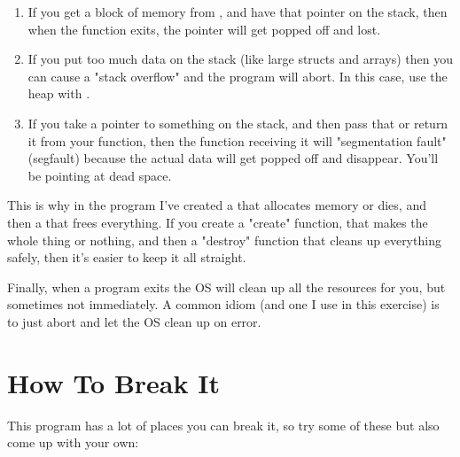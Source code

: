 \begin{enumerate}
\item If you get a block of memory from , and have that
    pointer on the stack, then when the function exits, the pointer will
    get popped off and lost.
\item If you put too much data on the stack (like large structs and arrays)
    then you can cause a "stack overflow" and the program will abort.  In
    this case, use the heap with .
\item If you take a pointer to something on the stack, and then pass that
    or return it from your function, then the function receiving it will
    "segmentation fault" (segfault) because the actual data will get 
    popped off and disappear.  You'll be pointing at dead space.
\end{enumerate}

This is why in the program I've created a  that allocates
memory or dies, and then a  that frees everything.  If you
create a "create" function, that makes the whole thing or nothing, and then a
"destroy" function that cleans up everything safely, then it's easier to keep 
it all straight.

Finally, when a program exits the OS will clean up all the resources for you,
but sometimes not immediately.  A common idiom (and one I use in this
exercise) is to just abort and let the OS clean up on error.

\section{How To Break It}

This program has a lot of places you can break it, so try some of these
but also come up with your own:

